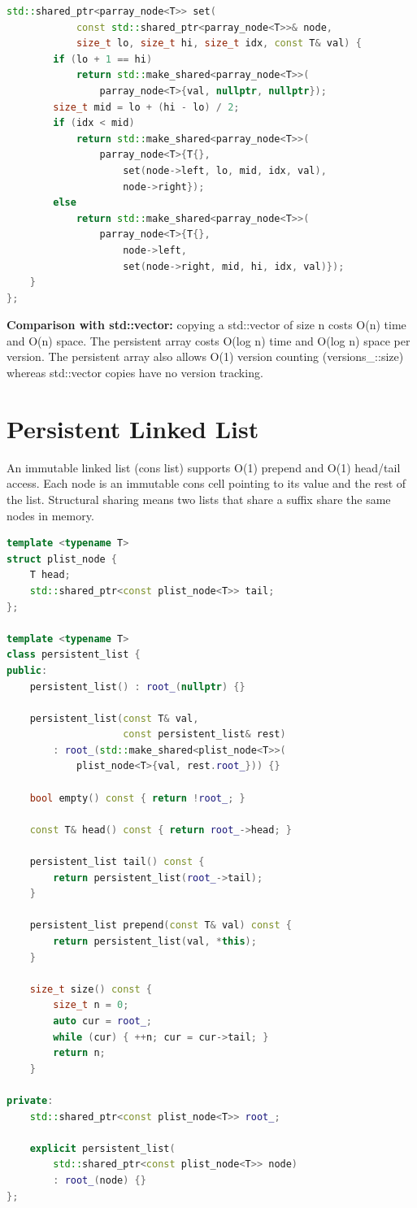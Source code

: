 \begin{lstlisting}[language=C++]
    std::shared_ptr<parray_node<T>> set(
            const std::shared_ptr<parray_node<T>>& node,
            size_t lo, size_t hi, size_t idx, const T& val) {
        if (lo + 1 == hi)
            return std::make_shared<parray_node<T>>(
                parray_node<T>{val, nullptr, nullptr});
        size_t mid = lo + (hi - lo) / 2;
        if (idx < mid)
            return std::make_shared<parray_node<T>>(
                parray_node<T>{T{},
                    set(node->left, lo, mid, idx, val),
                    node->right});
        else
            return std::make_shared<parray_node<T>>(
                parray_node<T>{T{},
                    node->left,
                    set(node->right, mid, hi, idx, val)});
    }
};
\end{lstlisting}

\textbf{Comparison with std::vector:} copying a std::vector of size n costs O(n) time and O(n) space. The persistent array costs O(log n) time and O(log n) space per version. The persistent array also allows O(1) version counting (versions\_::size) whereas std::vector copies have no version tracking.

\section{Persistent Linked List}\label{sec21:persistent-list}

An immutable linked list (cons list) supports O(1) prepend and O(1) head/tail access. Each node is an immutable cons cell pointing to its value and the rest of the list. Structural sharing means two lists that share a suffix share the same nodes in memory.

\begin{lstlisting}[language=C++]
template <typename T>
struct plist_node {
    T head;
    std::shared_ptr<const plist_node<T>> tail;
};

template <typename T>
class persistent_list {
public:
    persistent_list() : root_(nullptr) {}

    persistent_list(const T& val,
                    const persistent_list& rest)
        : root_(std::make_shared<plist_node<T>>(
            plist_node<T>{val, rest.root_})) {}

    bool empty() const { return !root_; }

    const T& head() const { return root_->head; }

    persistent_list tail() const {
        return persistent_list(root_->tail);
    }

    persistent_list prepend(const T& val) const {
        return persistent_list(val, *this);
    }

    size_t size() const {
        size_t n = 0;
        auto cur = root_;
        while (cur) { ++n; cur = cur->tail; }
        return n;
    }

private:
    std::shared_ptr<const plist_node<T>> root_;

    explicit persistent_list(
        std::shared_ptr<const plist_node<T>> node)
        : root_(node) {}
};
\end{lstlisting}

